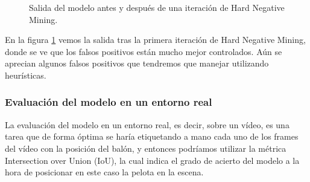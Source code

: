 \begin{figure}\centering
  \par
  \hfill
  \caption{Salida del modelo antes y después de una iteración de Hard Negative Mining.}
  \label{fig:hnmining}
\end{figure}

En la figura \ref{fig:hnmining} vemos la salida tras la primera iteración de Hard Negative Mining, donde se ve que los falsos positivos están mucho mejor controlados. Aún se aprecian algunos falsos positivos que tendremos que manejar utilizando heurísticas.

\subsubsection*{Evaluación del modelo en un entorno real}

La evaluación del modelo en un entorno real, es decir, sobre un vídeo, es una tarea que de forma óptima se haría etiquetando a mano cada uno de los frames del vídeo con la posición del balón, y entonces podríamos utilizar la métrica Intersection over Union (IoU), la cual indica el grado de acierto del modelo a la hora de posicionar en este caso la pelota en la escena.

